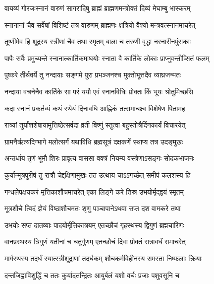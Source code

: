 \twolineshloka
{वायव्यं गोरजःस्नानं वारुणं सागरादिषु}
{ब्राह्मं ब्राह्मणमन्त्रोक्तं दिव्यं मेघाम्बु भास्करम्} %

\twolineshloka
{स्नानानां चैव सर्वेषां विशिष्टं तत्र वारुणम्}
{ब्राह्मणः क्षत्रियो वैश्यो मन्त्रवत्स्नानमाचरेत्} %

\twolineshloka
{तूष्णीमेव हि शूद्रस्य स्त्रीणां चैव तथा स्मृतम्}
{बाला च तरुणी वृद्धा नरनारीनपुंसकाः} %

\twolineshloka
{पापैः सर्वैः प्रमुच्यन्ते स्नानात्कार्तिकमाघयोः}
{स्नाता वै कार्तिके लोकाः प्राप्नुवन्तीप्सितं फलम्} %

\twolineshloka
{पुष्करे तीर्थवर्ये तु नन्दायाः सङ्गमे पुरा}
{प्रभञ्जनश्च मुक्तोभूत्तदैव व्याघ्रजन्मतः} %

\twolineshloka
{नन्दाया वचनेनैव कार्तिके सा परं ययौ}
{एवं स्नानविधिः प्रोक्तः किं भूयः श्रोतुमिच्छसि} %





\twolineshloka
{कदा स्नानं प्रकर्तव्यं कथं स्थेयं दिनावधि}
{आह्निकं तत्समाचक्ष्व विशेषेण पितामह} %

\twolineshloka
{रात्र्यां तुर्यांशशेषायामुत्तिष्ठेत्सर्वदा व्रती}
{विष्णुं स्तुत्वा बहुस्तोत्रैर्दिनकार्यं विचारयेत्} %

\twolineshloka
{ग्रामनैर्ऋत्यदिग्भागे मलोत्सर्गं यथाविधि}
{ब्रह्मसूत्रं दक्षकर्णे स्थाप्य तत्र उदङ्मुखः} %

\twolineshloka
{अन्तर्धाय तृणं भूमौ शिरः प्रावृत्य वाससा}
{वक्त्रं नियम्य वस्त्रेणाऽसङ्गः सोदकभाजनः} %

\twolineshloka
{कुर्यान्मूत्रपुरीषं तु रात्रौ चेद्दक्षिणामुखः}
{तत उत्थाय चाऽऽगच्छेत् समीपं कलशस्य हि} %

\twolineshloka
{गन्धलेपक्षयकरं मृत्तिकाशौचमाचरेत्}
{एका लिङ्गे करे तिस्र उभयोर्मृद्द्वयं स्मृतम्} %

\twolineshloka
{मूत्रशौचे त्विदं ज्ञेयं विष्ठाशौचमतः शृणु}
{पञ्चापानेऽथवा सप्त दश वामकरे तथा} %

\twolineshloka
{उभयोः सप्त दातव्याः पादयोर्मृत्तिकात्रयम्}
{एतच्छौचं गृहस्थस्य द्विगुणं ब्रह्मचारिणः} %

\twolineshloka
{वानप्रस्थस्य त्रिगुणं यतीनां च चतुर्गुणम्}
{एतच्छौचं दिवा प्रोक्तं रात्रावर्धं समाचरेत्} %

\twolineshloka
{मार्गस्थस्य तदर्धं स्यात्स्त्रीशूद्राणां तदर्धकम्}
{शौचकर्मविहीनस्य समस्ता निष्फलाः क्रियाः} %

\twolineshloka
{दन्तजिह्वाविशुद्धिं च ततः कुर्यादतन्द्रितः}
{आयुर्बलं यशो वर्चः प्रजाः पशुवसूनि च} %

